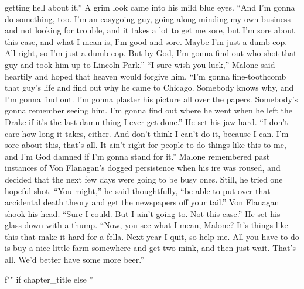 \documentclass{novel}
\begin{document}
getting hell about it.” A grim look came into his mild blue eyes. “And I’m gonna do something, too. I’m an easygoing guy, going along minding my own business and not looking for trouble, and it takes a lot to get me sore, but I’m sore about this case, and what I mean is, I’m good and sore. Maybe I’m just a dumb cop. All right, so I’m just a dumb cop. But by God, I’m gonna find out who shot that guy and took him up to Lincoln Park.” “I sure wish you luck,” Malone said heartily and hoped that heaven would forgive him. “I’m gonna fine-toothcomb that guy’s life and find out why he came to Chicago. Somebody knows why, and I’m gonna find out. I’m gonna plaster his picture all over the papers. Somebody’s gonna remember seeing him. I’m gonna find out where he went when he left the Drake if it’s the last damn thing I ever get done.” He set his jaw hard. “I don’t care how long it takes, either. And don’t think I can’t do it, because I can. I’m sore about this, that’s all. It ain’t right for people to do things like this to me, and I’m God damned if I’m gonna stand for it.” Malone remembered past instances of Von Flanagan’s dogged persistence when his ire was roused, and decided that the next few days were going to be busy ones. Still, he tried one hopeful shot. “You might,” he said thoughtfully, “be able to put over that accidental death theory and get the newspapers off your tail.” Von Flanagan shook his head. “Sure I could. But I ain’t going to. Not this case.” He set his glass down with a thump. “Now, you see what I mean, Malone? It’s things like this that make it hard for a fella. Next year I quit, so help me. All you have to do is buy a nice little farm somewhere and get two mink, and then just wait. That’s all. We’d better have some more beer.”

\begin{ChapterStart}
\vspace{3\nbs}
f"" if chapter_title else ''
\end{ChapterStart}
\end{document}

